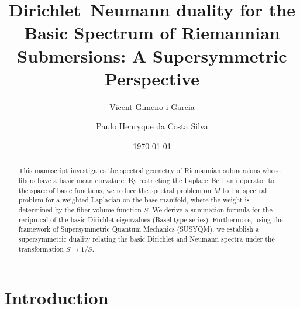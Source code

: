 \documentclass{amsart}
\theoremstyle{definition}
\theoremstyle{remark}
\numberwithin{equation}{section}
\begin{document}
\title[A Supersymmetric Perspective]{ Dirichlet--Neumann duality for the Basic Spectrum of Riemannian Submersions: A Supersymmetric Perspective}

\author{Vicent Gimeno i Garcia}
\address{Department of Mathematics, Universitat Jaume I-IMAC, E-12071, 
Castell\'{o}, Spain}

\author{Paulo Henryque da Costa Silva}
\address{Department of Mathematics, Universidade Federal do Cear\'{a}, 
60440-900, Fortaleza, Brazil}




\date{\today}

\begin{abstract}
This manuscript investigates the spectral geometry of Riemannian submersions whose fibers have a basic mean curvature. By restricting the Laplace--Beltrami operator to the space of basic functions, we reduce the spectral problem on $M$ to the spectral problem for a weighted Laplacian on the base manifold, where the weight is determined by the fiber-volume function $S$. We derive a summation formula for the reciprocal of the basic Dirichlet eigenvalues (Basel-type series). Furthermore, using the framework of Supersymmetric Quantum Mechanics (SUSYQM), we establish a supersym\-me\-tric duality relating the basic Dirichlet and Neumann spectra under the trans\-for\-ma\-tion $S \mapsto 1/S$. 
\end{abstract}

\maketitle

\section{Introduction}\label{sec:intro}
\end{document}
